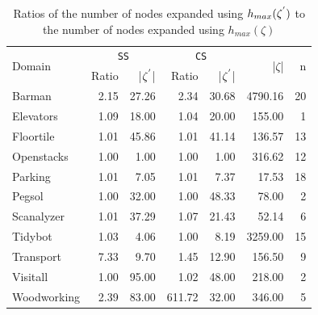 \begin{table}[]
\centering
\caption{Ratios of the number of nodes expanded using $h_{max}(\zeta\sp{'})$ to the number of nodes expanded using $h_{max}(\zeta)$}
\begin{tabular}{lrrrrrr}
\hline
\multirow{2}{*}{Domain} & \multicolumn{2}{c}{\texttt{SS}} & \multicolumn{2}{c}{\texttt{CS}}   & \multirow{2}{*}{|$\zeta$|} & \multirow{2}{*}{n} \\ \cline{2-5}
                        & Ratio    & |$\zeta\sp{'}$|   & Ratio  & |$\zeta\sp{'}$| &                            &                    \\ \hline
Barman                  & 2.15     & 27.26       & 2.34   & 30.68           & 4790.16                    & 20                 \\
Elevators               & 1.09     & 18.00       & 1.04   & 20.00           & 155.00                     & 1                  \\
Floortile               & 1.01     & 45.86       & 1.01   & 41.14           & 136.57                     & 13                 \\
Openstacks              & 1.00     & 1.00        & 1.00   & 1.00            & 316.62                     & 12                 \\
Parking                 & 1.01     & 7.05        & 1.01   & 7.37            & 17.53                      & 18                 \\
Pegsol                  & 1.00     & 32.00       & 1.00   & 48.33           & 78.00                      & 2                  \\
Scanalyzer              & 1.01     & 37.29       & 1.07   & 21.43           & 52.14                      & 6                  \\
Tidybot                 & 1.03     & 4.06        & 1.00   & 8.19            & 3259.00                    & 15                 \\
Transport               & 7.33     & 9.70        & 1.45   & 12.90           & 156.50                     & 9                  \\
Visitall                & 1.00     & 95.00       & 1.02   & 48.00           & 218.00                     & 2                  \\
Woodworking             & 2.39     & 83.00       & 611.72 & 32.00           & 346.00                     & 5                  \\ \hline
\end{tabular}
\label{tb_one}
\end{table}

